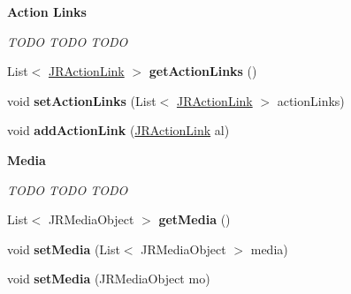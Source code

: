 \begin{Indent}{\bf Action Links}\par
{\em \label{_amgrp6394c01794b89998240d1f1410c74277}
 TODO TODO TODO }\begin{DoxyCompactItemize}
\item 
\hypertarget{classcom_1_1janrain_1_1android_1_1engage_1_1types_1_1_j_r_activity_object_aa6c896c3414d99e74895eda895025573}{
List$<$ \hyperlink{classcom_1_1janrain_1_1android_1_1engage_1_1types_1_1_j_r_action_link}{JRActionLink} $>$ {\bfseries getActionLinks} ()}
\label{classcom_1_1janrain_1_1android_1_1engage_1_1types_1_1_j_r_activity_object_aa6c896c3414d99e74895eda895025573}

\item 
\hypertarget{classcom_1_1janrain_1_1android_1_1engage_1_1types_1_1_j_r_activity_object_a081d9f6608b311f1d09baccfc22d765d}{
void {\bfseries setActionLinks} (List$<$ \hyperlink{classcom_1_1janrain_1_1android_1_1engage_1_1types_1_1_j_r_action_link}{JRActionLink} $>$ actionLinks)}
\label{classcom_1_1janrain_1_1android_1_1engage_1_1types_1_1_j_r_activity_object_a081d9f6608b311f1d09baccfc22d765d}

\item 
\hypertarget{classcom_1_1janrain_1_1android_1_1engage_1_1types_1_1_j_r_activity_object_abed8562025905cffc47ca06227fd11fe}{
void {\bfseries addActionLink} (\hyperlink{classcom_1_1janrain_1_1android_1_1engage_1_1types_1_1_j_r_action_link}{JRActionLink} al)}
\label{classcom_1_1janrain_1_1android_1_1engage_1_1types_1_1_j_r_activity_object_abed8562025905cffc47ca06227fd11fe}

\end{DoxyCompactItemize}
\end{Indent}
\begin{Indent}{\bf Media}\par
{\em \label{_amgrp3b563524fdb17b4a86590470d40bef74}
 TODO TODO TODO }\begin{DoxyCompactItemize}
\item 
\hypertarget{classcom_1_1janrain_1_1android_1_1engage_1_1types_1_1_j_r_activity_object_a52553e9e6b54169e7479f988c09c4532}{
List$<$ JRMediaObject $>$ {\bfseries getMedia} ()}
\label{classcom_1_1janrain_1_1android_1_1engage_1_1types_1_1_j_r_activity_object_a52553e9e6b54169e7479f988c09c4532}

\item 
\hypertarget{classcom_1_1janrain_1_1android_1_1engage_1_1types_1_1_j_r_activity_object_aa891704e795b404d59b3b59f63103056}{
void {\bfseries setMedia} (List$<$ JRMediaObject $>$ media)}
\label{classcom_1_1janrain_1_1android_1_1engage_1_1types_1_1_j_r_activity_object_aa891704e795b404d59b3b59f63103056}

\item 
\hypertarget{classcom_1_1janrain_1_1android_1_1engage_1_1types_1_1_j_r_activity_object_ad53f39e97240a9c8eb3945b8023f275f}{
void {\bfseries setMedia} (JRMediaObject mo)}
\label{classcom_1_1janrain_1_1android_1_1engage_1_1types_1_1_j_r_activity_object_ad53f39e97240a9c8eb3945b8023f275f}

\end{DoxyCompactItemize}
\end{Indent}
